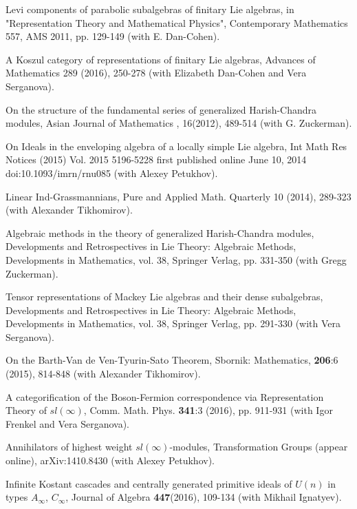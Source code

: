\documentclass[11pt]{amsart}
\begin{document}
\myss \label{55.} Levi components of parabolic subalgebras of finitary Lie algebras, in "Representation Theory and Mathematical Physics", Contemporary Mathematics 557, AMS 2011, pp. 129-149 (with E. Dan-Cohen).

\myss \label{56.} A Koszul category of representations of finitary Lie algebras, Advances of Mathematics 289 (2016), 250-278 (with Elizabeth Dan-Cohen and Vera Serganova).

\myss \label{57.} On the structure of the fundamental series of generalized Harish-Chandra modules, Asian Journal of Mathematics , 16(2012), 489-514 (with G. Zuckerman).

\myss \label{58.} On Ideals in the enveloping algebra of a locally simple Lie algebra, Int Math Res Notices (2015) Vol. 2015 5196-5228 first published online June 10, 2014 doi:10.1093/imrn/rnu085 (with Alexey Petukhov).

\myss \label{59.} Linear Ind-Grassmannians, Pure and Applied Math. Quarterly 10 (2014), 289-323 (with Alexander Tikhomirov).

\myss \label{60.} Algebraic methods in the theory of generalized Harish-Chandra modules, Developments and Retrospectives in Lie Theory: Algebraic Methods, Developments in Mathematics, vol. 38, Springer Verlag, pp. 331-350 (with Gregg Zuckerman).

\myss \label{61.} Tensor representations of Mackey Lie algebras and their dense subalgebras, Developments and Retrospectives in Lie Theory: Algebraic Methods, Developments in Mathematics, vol. 38, Springer Verlag, pp. 291-330 (with Vera Serganova).

\myss \label{62.} On the Barth-Van de Ven-Tyurin-Sato Theorem, Sbornik: Mathematics, \textbf{206}:6 (2015), 814-848 (with Alexander Tikhomirov).

\myss \label{63.} A categorification of the Boson-Fermion correspondence via Representation Theory of $sl(\infty)$,  Comm. Math. Phys. \textbf{341}:3 (2016), pp. 911-931 (with Igor Frenkel and Vera Serganova).

\myss \label{64.} Annihilators of highest weight $sl(\infty)$-modules, Transformation Groups (appear online), arXiv:1410.8430 (with Alexey Petukhov).

\myss \label{65.} Infinite Kostant cascades and centrally generated primitive ideals of $U(n)$ in types $A_\infty$, $C_\infty$, Journal of Algebra \textbf{447}(2016), 109-134 (with Mikhail Ignatyev).
\end{document}
